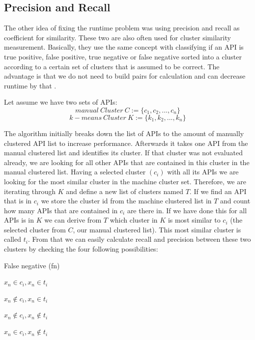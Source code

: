 \documentclass[a4paper]{IEEEtran}
\begin{document}
\subsection{Precision and Recall}
The other idea of fixing the runtime problem was using precision and recall as coefficient for similarity. These two are also often used for cluster similarity measurement. Basically, they use the same concept with classifying if an API is true positive, false positive, true negative or false negative sorted into a cluster according to a certain set of clusters that is assumed to be correct. The advantage is that we do not need to build pairs for calculation and can decrease runtime by that \cite{powers2011evaluation}.

Let assume we have two sets of APIs:
\begin{equation*}
manual~Cluster~C := \{ c_1,c_2,...,c_n \}
\end{equation*}
\begin{equation*}
k-means~Cluster~K := \{ k_1,k_2,...,k_n \}
\end{equation*}

The algorithm initially breaks down the list of APIs to the amount of manually clustered API list to increase performance. 
Afterwards it takes one API from the manual clustered list and identifies its cluster. If that cluster was not evaluated already, we are looking for all other APIs that are contained in this cluster in the manual clustered list. Having a selected cluster $(c_i)$ with all its APIs we are looking for the most similar cluster in the machine cluster set. Therefore, we are iterating through $K$ and define a new list of clusters named $T$. If we find an API that is in $c_i$ we store the cluster id from the machine clustered list in $T$ and count how many APIs that are contained in $c_i$ are there in. If we have done this for all APIs is in $K$ we can derive from $T$ which cluster in $K$ is most similar to $c_i$ (the selected cluster from $C$, our manual clustered list). This most similar cluster is called $t_i$. From that we can easily calculate recall and precision between these two clusters by checking the four following possibilities:

\begin{labeling}{False negative (fn)}
\centering \item  [True positive (tp)] $x_n \in c_i,x_n \in t_i$
\item [False positive (fp)] $x_n \notin c_i,x_n \in t_i$
\item [True negative (tn)] $x_n \notin c_i,x_n \notin t_i$
\item [False negative (fn)] $x_n \in c_i,x_n \notin t_i$
\end{labeling}
\end{document}
